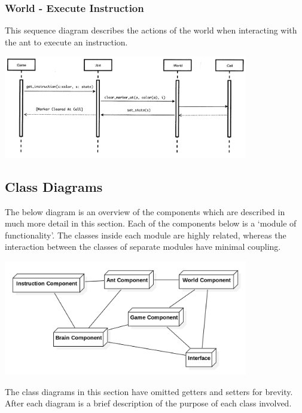 \documentclass[11pt]{article}
\begin{document}
\subsubsection{World - Execute Instruction}

This sequence diagram describes the actions of the world when interacting with the ant to execute an instruction.

\begin{center}
\includegraphics[width=0.8\textwidth]{low-level-diagrams/sequence/ant-unmark.png}
\end{center}

\subsection{Class Diagrams}

The below diagram is an overview of the components which are described in much more detail in this section. Each of the components below is a `module of functionality'. The classes inside each module are highly related, whereas the interaction between the classes of separate modules have minimal coupling.

\begin{center}
\includegraphics[width=0.8\textwidth]{low-level-diagrams/class/components.png}
\end{center}

The class diagrams in this section have omitted getters and setters for brevity. After each diagram is a brief description of the purpose of each class involved.
\end{document}
